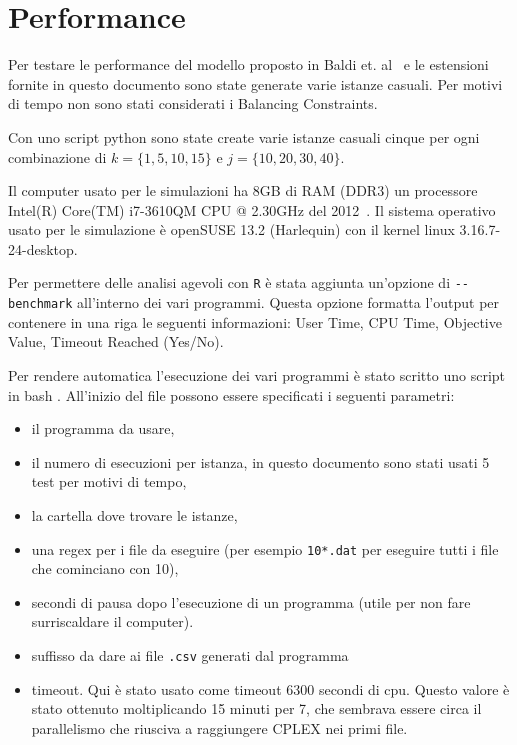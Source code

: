 \section{Performance}
Per testare le performance del modello proposto in Baldi et. 
al~\cite{Baldi20129802} e le estensioni fornite
in questo documento sono state generate varie istanze casuali.
Per motivi di tempo non sono stati considerati i Balancing Constraints. 

Con uno script python  sono state create varie
istanze casuali cinque per ogni 
combinazione di $k = \{1,5,10,15\}$ e $j = \{10,20,30,40\}$. 

Il computer usato per le simulazioni ha 8GB di RAM (DDR3) un processore 
Intel(R) Core(TM) i7-3610QM CPU @ 2.30GHz del 2012~\cite{cpu}.
Il sistema operativo usato per le simulazione è openSUSE 13.2 (Harlequin) con
il kernel linux 3.16.7-24-desktop.

Per permettere delle analisi agevoli con \verb|R| è stata aggiunta un'opzione di
\verb|--benchmark| all'interno dei vari programmi. 
Questa opzione formatta l'output per contenere in una riga le seguenti 
informazioni: User Time, CPU Time, Objective Value, Timeout Reached (Yes/No).

Per rendere automatica l'esecuzione dei vari programmi è stato scritto uno 
script in bash . 
All'inizio del file possono essere specificati i seguenti parametri:
\begin{itemize}
\item il programma da usare, 
\item il numero di esecuzioni per istanza, in questo documento sono stati usati
5 test per motivi di tempo,
\item la cartella dove trovare le istanze, 
\item una regex per i file da eseguire  (per esempio \verb|10*.dat| per eseguire
 tutti i file che cominciano con 10), 
\item secondi di pausa dopo l'esecuzione di un programma 
(utile per non fare surriscaldare il computer).
\item suffisso da dare ai file \verb|.csv| generati dal programma
\item timeout. Qui è stato usato come timeout 6300 secondi di cpu. Questo valore
è stato ottenuto moltiplicando 15 minuti per 7, che sembrava essere
circa il parallelismo che riusciva a raggiungere CPLEX nei primi file.
\end{itemize}

